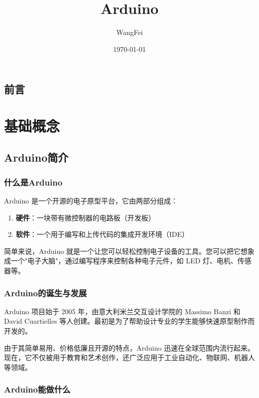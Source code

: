 \documentclass[12pt,UTF8]{ctexbook}
\title{\heiti\zihao{0} Arduino}
\author{WangFei}
\date{\today}
\begin{document}
\maketitle
\tableofcontents

\frontmatter
\chapter{前言}

\mainmatter

\part{基础概念}

\chapter{Arduino简介}

\section{什么是Arduino}

Arduino 是一个开源的电子原型平台，它由两部分组成：

\begin{enumerate}
    \item \textbf{硬件}：一块带有微控制器的电路板（开发板）
    \item \textbf{软件}：一个用于编写和上传代码的集成开发环境（IDE）
\end{enumerate}

简单来说，Arduino 就是一个让您可以轻松控制电子设备的工具。您可以把它想象成一个"电子大脑"，通过编写程序来控制各种电子元件，如 LED 灯、电机、传感器等。

\section{Arduino的诞生与发展}

Arduino 项目始于 2005 年，由意大利米兰交互设计学院的 Massimo Banzi 和 David Cuartielles 等人创建。最初是为了帮助设计专业的学生能够快速原型制作而开发的。

由于其简单易用、价格低廉且开源的特点，Arduino 迅速在全球范围内流行起来。现在，它不仅被用于教育和艺术创作，还广泛应用于工业自动化、物联网、机器人等领域。

\section{Arduino能做什么}
\end{document}
